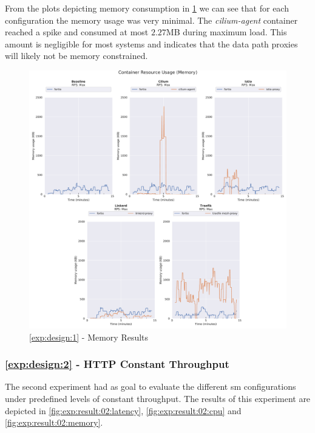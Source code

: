 From the plots depicting memory consumption in \cref{fig:exp:result:01:memory} we can see that for each configuration the memory usage was very minimal. The \textit{cilium-agent} container reached a spike and consumed at most $2.27$MB during maximum load. This amount is negligible for most systems and indicates that the data path proxies will likely not be memory constrained.

\begin{figure}[!t]
    \centering
    
    \includegraphics[width=\linewidth]{5_experimental_evaluation/figures/exp_01-memory-results.pdf}

    \caption{\ref{exp:design:1} - Memory Results}
    
    \label{fig:exp:result:01:memory}
\end{figure}



\subsubsection{\ref{exp:design:2} - HTTP Constant Throughput}
\label{sec:experiments:results:per-experiment:02}

The second experiment had as goal to evaluate the different \gls{sm} configurations under predefined levels of constant throughput. The results of this experiment are depicted in \cref{fig:exp:result:02:latency}, \cref{fig:exp:result:02:cpu} and \cref{fig:exp:result:02:memory}.


